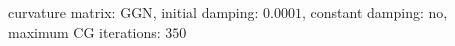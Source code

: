 curvature matrix: $\text{GGN}$, initial damping: $\num[scientific-notation=true]{0.0001}$, constant damping: $\text{no}$, maximum CG iterations: $\num[scientific-notation=false]{350}$